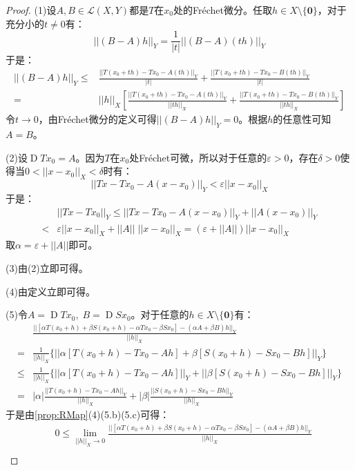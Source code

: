 \begin{proof}
	(1)设$A,B\in\mathcal{L}(X,Y)$都是$T$在$x_0$处的Fr\'echet微分。任取$h\in X\setminus\{\mathbf{0}\}$，对于充分小的$t\ne0$有：
	\begin{equation*}
		||(B-A)h||_Y=\frac{1}{|t|}||(B-A)(th)||_Y
	\end{equation*}
	于是：
	\begin{align*}
		||(B-A)h||_Y\leqslant&\frac{||T(x_0+th)-Tx_0-A(th)||_Y}{|t|}+\frac{||T(x_0+th)-Tx_0-B(th)||_Y}{|t|} \\
		=&||h||_X\left[\frac{||T(x_0+th)-Tx_0-A(th)||_Y}{||th||_X}+\frac{||T(x_0+th)-Tx_0-B(th)||_Y}{||th||_X}\right]
	\end{align*}
	令$t\to0$，由Fr\'echet微分的定义可得$||(B-A)h||_Y=0$。根据$h$的任意性可知$A=B$。\par
	(2)设$\operatorname{D}Tx_0=A$。因为$T$在$x_0$处Fr\'echet可微，所以对于任意的$\varepsilon>0$，存在$\delta>0$使得当$0<||x-x_0||_X<\delta$时有：
	\begin{equation*}
		||Tx-Tx_0-A(x-x_0)||_Y<\varepsilon||x-x_0||_X
	\end{equation*}
	于是：
	\begin{align*}
		&||Tx-Tx_0||_Y\leqslant||Tx-Tx_0-A(x-x_0)||_Y+||A(x-x_0)||_Y \\
		<&\varepsilon||x-x_0||_X+||A||\;||x-x_0||_X=(\varepsilon+||A||)||x-x_0||_X
	\end{align*}
	取$\alpha=\varepsilon+||A||$即可。\par
	(3)由(2)立即可得。\par
	(4)由定义立即可得。\par
	(5)令$A=\operatorname{D}Tx_0,\;B=\operatorname{D}Sx_0$。对于任意的$h\in X\setminus\{\mathbf{0}\}$有：
	\begin{align*}
		&\frac{||[\alpha T(x_0+h)+\beta S(x_0+h)-\alpha Tx_0-\beta Sx_0]-(\alpha A+\beta B)h||_Y}{||h||_X} \\
		=&\frac{1}{||h||_X}\{||\alpha[T(x_0+h)-Tx_0-Ah]+\beta[S(x_0+h)-Sx_0-Bh]||_Y\} \\
		\leqslant&\frac{1}{||h||_X}\{||\alpha[T(x_0+h)-Tx_0-Ah]||_Y+||\beta[S(x_0+h)-Sx_0-Bh]||_Y\} \\
		=&|\alpha|\frac{||T(x_0+h)-Tx_0-Ah||_Y}{||h||_X}+|\beta|\frac{||S(x_0+h)-Sx_0-Bh||_Y}{||h||_X}
	\end{align*}
	于是由\cref{prop:RMap}(4)(5.b)(5.c)可得：
	\begin{align*}
		&0\leqslant\lim_{||h||_X\to0}\frac{||[\alpha T(x_0+h)+\beta S(x_0+h)-\alpha Tx_0-\beta Sx_0]-(\alpha A+\beta B)h||_Y}{||h||_X} \\

\end{align*}
\end{proof}
